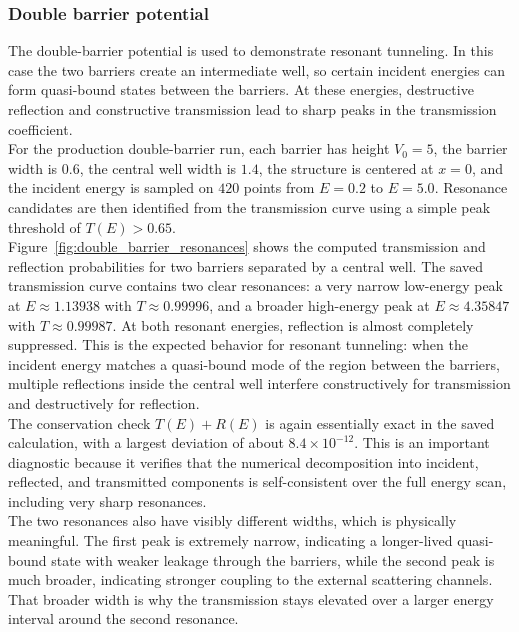 \documentclass[11pt]{article}
\begin{document}
\begin{refsection}
            \subsubsection{Double barrier potential}
                The double-barrier potential is used to demonstrate resonant tunneling. In this case the two barriers create an intermediate well, so certain incident energies can form quasi-bound states between the barriers. At these energies, destructive reflection and constructive transmission lead to sharp peaks in the transmission coefficient. \\

                For the production double-barrier run, each barrier has height $V_0=5$, the barrier width is $0.6$, the central well width is $1.4$, the structure is centered at $x=0$, and the incident energy is sampled on $420$ points from $E=0.2$ to $E=5.0$. Resonance candidates are then identified from the transmission curve using a simple peak threshold of $T(E)>0.65$. \\

                Figure~\ref{fig:double_barrier_resonances} shows the computed transmission and reflection probabilities for two barriers separated by a central well. The saved transmission curve contains two clear resonances: a very narrow low-energy peak at $E\approx1.13938$ with $T\approx0.99996$, and a broader high-energy peak at $E\approx4.35847$ with $T\approx0.99987$. At both resonant energies, reflection is almost completely suppressed. This is the expected behavior for resonant tunneling: when the incident energy matches a quasi-bound mode of the region between the barriers, multiple reflections inside the central well interfere constructively for transmission and destructively for reflection. \\

                The conservation check $T(E)+R(E)$ is again essentially exact in the saved calculation, with a largest deviation of about $8.4\times10^{-12}$. This is an important diagnostic because it verifies that the numerical decomposition into incident, reflected, and transmitted components is self-consistent over the full energy scan, including very sharp resonances. \\

                The two resonances also have visibly different widths, which is physically meaningful. The first peak is extremely narrow, indicating a longer-lived quasi-bound state with weaker leakage through the barriers, while the second peak is much broader, indicating stronger coupling to the external scattering channels. That broader width is why the transmission stays elevated over a larger energy interval around the second resonance. \\


\end{refsection}
\end{document}
